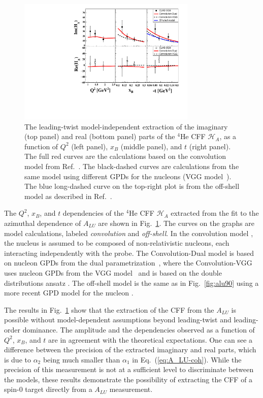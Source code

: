 \documentclass[twocolumn,nofootinbib,showpacs,prl,superscriptaddress,secnumarabic,amssymb,nobibnotes,aps,floatfix]{revtex4}
\begin{document}
\begin{figure}[tb]
\includegraphics[width=8.5cm]{F_Coherent_CFF.pdf}
\caption{The leading-twist model-independent extraction of the imaginary (top panel) and
real (bottom panel) parts of the $^4$He CFF $\mathcal{H}_A$, as a function of
$Q^{2}$ (left panel), $x_B$ (middle panel), and $t$ (right panel). The full red 
curves are the calculations based on the convolution model from Ref.~\cite{Vadim_priv}.
The black-dashed curves are calculations from the same 
model using different GPDs for the nucleons (VGG model~\cite{Guidal:2004nd}). The 
blue long-dashed curve on the top-right plot is from
the off-shell model as described in Ref.~\cite{GonzalezHernandez:2012jv}.}
\label{fig:CFF_HA}
\end{figure}

The $Q^2$, $x_B$, and $t$ dependencies of the $^4$He CFF $\mathcal{H}_A$ 
extracted from the fit to the azimuthal dependence of $A_{LU}$ are shown in 
Fig.~\ref{fig:CFF_HA}. The curves on the graphs are model calculations, labeled 
{\it convolution} and {\it off-shell}. In the convolution model 
\cite{Vadim_priv}, the nucleus is assumed to be composed of non-relativistic 
nucleons, each interacting independently with the probe. The Convolution-Dual 
model is based on nucleon GPDs from the dual parametrization~\cite{Guzey:2006xi}, 
where the Convolution-VGG uses nucleon GPDs from the VGG model~\cite{Guidal:2004nd} 
and is based on the double distributions ansatz \cite{DD_model}. The 
off-shell model is the same as in Fig.~\ref{fig:alu90} using a more recent
GPD model for the nucleon \cite{GonzalezHernandez:2012jv}.

The results in Fig.~\ref{fig:CFF_HA} show that the extraction of the CFF
from the $A_{LU}$ is possible without model-dependent assumptions beyond
leading-twist and leading-order dominance. The amplitude and the dependencies 
observed as a function of 
$Q^{2}$, $x_B$, and $t$ are in agreement with the theoretical expectations. One 
can see a difference between the precision of the extracted imaginary and real 
parts, which is due to $\alpha_2$ being much smaller than $\alpha_1$ in
Eq.~(\ref{eq:A_LU-coh}). While the precision of this measurement is not at a
sufficient level to discriminate between the models, these results demonstrate
the possibility of extracting the CFF of a spin-0 target directly from a $A_{LU}$
measurement.
\end{document}

